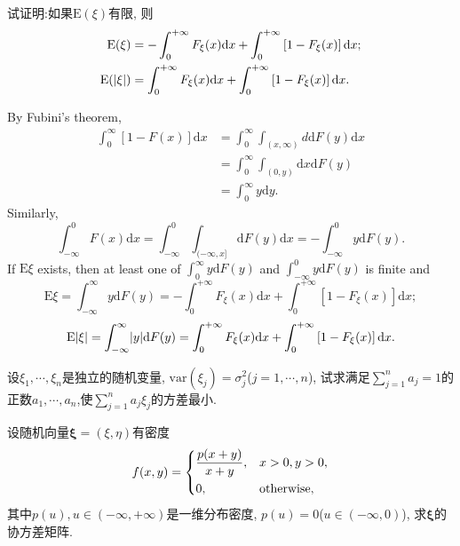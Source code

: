 \begin{yyEx}
	试证明:如果$\mathrm{E}(\xi)$有限, 则
	\begin{align}
	\mathrm{E}(\xi) &= -\int_{0}^{+\infty}F_{\xi}(x)\mathrm{d}x+\int_{0}^{+\infty}\left[ 1-F_{\xi}(x) \right]\mathrm{d}x;\nonumber\\
	\mathrm{E}(\lvert\xi\rvert) &= \int_{0}^{+\infty}F_{\xi}(x)\mathrm{d}x+\int_{0}^{+\infty}\left[ 1-F_{\xi}(x) \right]\mathrm{d}x.
	\end{align}	
\end{yyEx}
\begin{yyProof}
	By Fubini's theorem,
	\begin{align}
	\int_{0}^{\infty}[1-F(x)]\mathrm{d}x&=\int_{0}^{\infty}\int_{(x,\infty)}d\mathrm{d}F(y)\mathrm{d}x\nonumber\\
	&=\int_{0}^{\infty}\int_{(0,y)}\mathrm{d}x\mathrm{d}F(y)\nonumber\\
	&=\int_{0}^{\infty}y\mathrm{d}y.
	\end{align}
	Similarly,\begin{equation}
	\int_{-\infty}^0F(x)\mathrm{d}x=\int_{-\infty}^0\int_{(-\infty,x]}\mathrm{d}F(y)\mathrm{d}x = -\int_{-\infty}^0y\mathrm{d}F(y).
	\end{equation}
	If $\mathrm{E}\xi$ exists, then at least one of $\int_{0}^{\infty}y\mathrm{d}F(y)$ and $\int_{-\infty}^0y\mathrm{d}F(y)$ is finite and
	\begin{equation}
	\mathrm{E}\xi = \int_{-\infty}^{\infty}y\mathrm{d}F(y) =  -\int_{0}^{+\infty}F_{\xi}(x)\mathrm{d}x+\int_{0}^{+\infty}\left[ 1-F_{\xi}(x) \right]\mathrm{d}x;
	\end{equation}
	\begin{equation}
	\mathrm{E}\lvert\xi\rvert = \int_{-\infty}^\infty \lvert y\rvert\mathrm{d}F(y) = \int_{0}^{+\infty}F_{\xi}(x)\mathrm{d}x+\int_{0}^{+\infty}\left[ 1-F_{\xi}(x) \right]\mathrm{d}x.
	\end{equation}
\end{yyProof}

\begin{yyEx}
	设$\xi_1,\cdots,\xi_n$是独立的随机变量, $\mathrm{var}(\xi_j) = \sigma_j^2$($j=1,\cdots,n$), 试求满足$\sum\limits_{j=1}^na_j = 1$的正数$a_1,\cdots,a_n$,使$\sum\limits_{j=1}^na_j\xi_j$的方差最小.
\end{yyEx}

\begin{yyEx}
	设随机向量$\bm{\xi} = (\xi,\eta)$有密度
	\begin{equation}
	f(x,y) = \begin{dcases}
	\frac{p(x+y)}{x+y},&x>0,y>0,\\
	0,&\text{otherwise},
	\end{dcases}
	\end{equation}
	其中$p(u),u\in(-\infty,+\infty)$是一维分布密度, $p(u) = 0$($u\in(-\infty,0)$), 求$\bm{\xi}$的协方差矩阵.
\end{yyEx}

